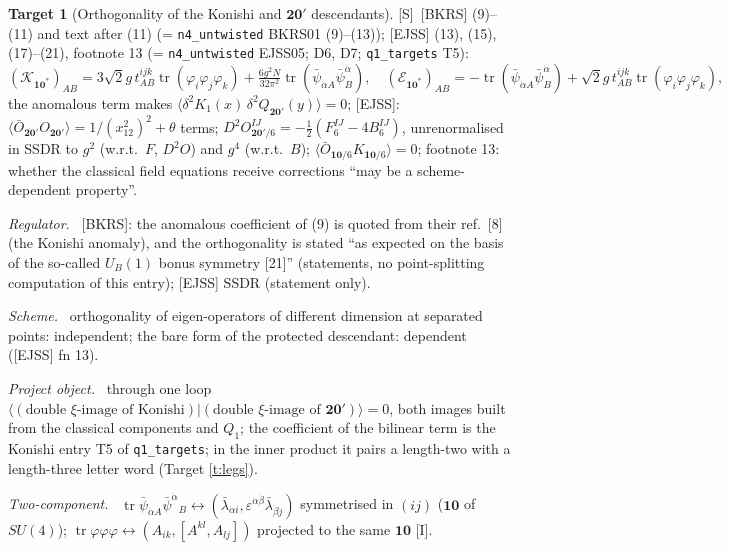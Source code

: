 \documentclass[11pt]{article}
\theoremstyle{definition}
\newtheorem{target}{Target}
\newcommand{\tr}{\operatorname{tr}}
\newcommand{\Sl}{\textup{[S]}}
\newcommand{\Il}{\textup{[I]}}
\newcommand{\fld}[1]{\par\textit{#1.}\ }
\begin{document}
\begin{target}[Orthogonality of the Konishi and $\mathbf{20'}$ descendants]\label{t:orth}
\Sl\ [BKRS] (9)--(11) and text after (11) (= \texttt{n4\_untwisted} BKRS01 (9)--(13)); [EJSS] (13), (15), (17)--(21), footnote 13 (= \texttt{n4\_untwisted} EJSS05; D6, D7; \texttt{q1\_targets} T5):
\[
(\mathcal K_{\mathbf{10}^*})_{AB}=3\sqrt2g\,t^{ijk}_{AB}\tr(\varphi_i\varphi_j\varphi_k)+\tfrac{6g^2N}{32\pi^2}\tr(\bar\psi_{\dot\alpha A}\bar\psi^{\dot\alpha}_B),\quad(\mathcal E_{\mathbf{10}^*})_{AB}=-\tr(\bar\psi_{\dot\alpha A}\bar\psi^{\dot\alpha}_B)+\sqrt2g\,t^{ijk}_{AB}\tr(\varphi_i\varphi_j\varphi_k),
\]
the anomalous term makes $\langle\delta^2K_1(x)\,\delta^2Q_{\mathbf{20'}}(y)\rangle=0$; [EJSS]: $\langle\bar O_{\mathbf{20'}}O_{\mathbf{20'}}\rangle=1/(x_{12}^2)^2+\theta$ terms; $D^2O^{IJ}_{\mathbf{20'}/6}=-\tfrac12(F_6^{IJ}-4B_6^{IJ})$, unrenormalised in SSDR to $g^2$ (w.r.t.\ $F$, $D^2O$) and $g^4$ (w.r.t.\ $B$); $\langle\bar O_{\mathbf{10}/6}K_{\mathbf{10}/6}\rangle=0$; footnote 13: whether the classical field equations receive corrections ``may be a scheme-dependent property''.
\fld{Regulator} [BKRS]: the anomalous coefficient of (9) is quoted from their ref.~[8] (the Konishi anomaly), and the orthogonality is stated ``as expected on the basis of the so-called $U_B(1)$ bonus symmetry [21]'' (statements, no point-splitting computation of this entry); [EJSS] SSDR (statement only).
\fld{Scheme} orthogonality of eigen-operators of different dimension at separated points: independent; the bare form of the protected descendant: dependent ([EJSS] fn 13).
\fld{Project object} through one loop $\langle(\text{double }\xi\text{-image of Konishi})|(\text{double }\xi\text{-image of }\mathbf{20'})\rangle=0$, both images built from the classical components and $Q_1$; the coefficient of the bilinear term is the Konishi entry T5 of \texttt{q1\_targets}; in the inner product it pairs a length-two with a length-three letter word (Target \ref{t:legs}).
\fld{Two-component} $\tr\bar\psi_{\dot\alpha A}\bar\psi^{\dot\alpha}{}_B\leftrightarrow(\bar\lambda_{\dot\alpha i},\varepsilon^{\dot\alpha\dot\beta}\bar\lambda_{\dot\beta j})$ symmetrised in $(ij)$ ($\mathbf{10}$ of $SU(4)$); $\tr\varphi\varphi\varphi\leftrightarrow(A_{ik},[A^{kl},A_{lj}])$ projected to the same $\mathbf{10}$ \Il.
\end{target}
\end{document}
